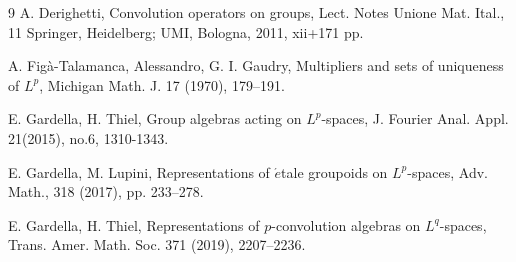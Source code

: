 \documentclass[reqno,11pt]{amsart}
\theoremstyle{plain}
\theoremstyle{definition}
\theoremstyle{remark}
\begin{document}
\begin{thebibliography}{9}
A. Derighetti, Convolution operators on groups, Lect. Notes Unione Mat. Ital., 11
Springer, Heidelberg; UMI, Bologna, 2011, xii+171 pp.

A. Figà-Talamanca, Alessandro, G. I. Gaudry, Multipliers and sets of uniqueness of  $L^p$, Michigan Math. J. 17 (1970), 179–191.









%

%

%
       E. Gardella, H. Thiel, Group algebras acting on  $L^{p}$-spaces, J. Fourier Anal. Appl. 21(2015),
no.6, 1310-1343.



         E. Gardella, M. Lupini, Representations of $\acute{e}$tale groupoids on $L^{p}$-spaces, Adv. Math., 318 (2017), pp. 233--278.

      E. Gardella, H. Thiel, Representations of $p$-convolution algebras on
$L^{q}$-spaces, Trans. Amer. Math. Soc. 371 (2019), 2207--2236.


\end{thebibliography}
\end{document}

